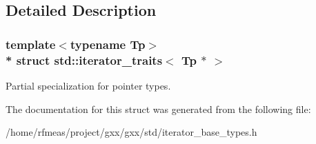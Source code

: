 \subsection{Detailed Description}
\subsubsection*{template$<$typename Tp$>$\\*
struct std\+::iterator\+\_\+traits$<$ Tp $\ast$ $>$}

Partial specialization for pointer types. 

The documentation for this struct was generated from the following file\+:\begin{DoxyCompactItemize}
\item 
/home/rfmeas/project/gxx/gxx/std/iterator\+\_\+base\+\_\+types.\+h\end{DoxyCompactItemize}
